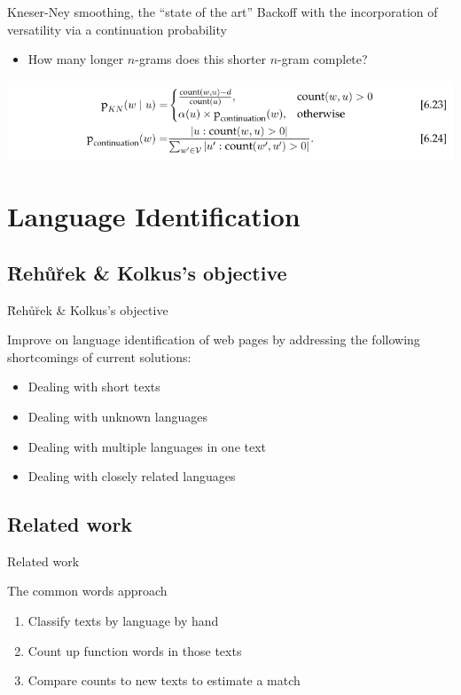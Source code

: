 \documentclass{beamer}
\begin{document}
      \begin{frame}{\subthree}
        \begin{block}{Kneser-Ney smoothing, the ``state of the art''}
          Backoff with the incorporation of versatility via a continuation probability
          \begin{itemize}
            \item How many longer $n$-grams does this shorter $n$-gram complete?
          \end{itemize}
        \end{block}
        \includegraphics[scale=0.5]{kneser-ney.png}
      \end{frame}

  \section{Language Identification}
    \newcommand{\subfive}{R̆ehůr̆ek \& Kolkus's objective}
    \subsection{\subfive}
      \begin{frame}{\subfive}
        \begin{block}{}
          Improve on language identification of web pages by addressing the following shortcomings of current solutions:
          \begin{itemize}
            \item Dealing with short texts
            \item Dealing with unknown languages
            \item Dealing with multiple languages in one text
            \item Dealing with closely related languages
          \end{itemize}
        \end{block}
      \end{frame}

    \newcommand{\subsix}{Related work}
    \subsection{\subsix}
      \begin{frame}{\subsix}
        \begin{block}{The common words approach}
          \begin{enumerate}
            \item Classify texts by language by hand
            \item Count up function words in those texts
            \item Compare counts to new texts to estimate a match
          \end{enumerate}
        \end{block}
      \end{frame}
\end{document}
